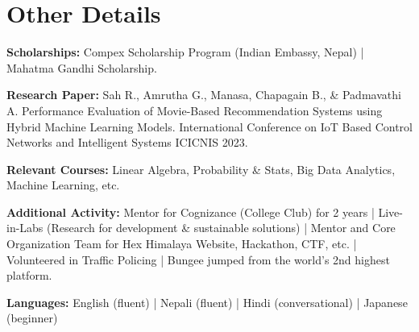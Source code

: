 \documentclass[a4paper,11pt]{article}
\begin{document}
\section{Other Details}
\begin{itemize}[leftmargin=0.15in, label={}]
	\setlength\itemsep{-2pt}
	\small{
\item{
		      \textbf{Scholarships:}{ Compex Scholarship Program (Indian Embassy, Nepal) | Mahatma Gandhi Scholarship.} \\
		}

\item{
		      \textbf{Research Paper:}{ Sah R., Amrutha G., Manasa, Chapagain B., \& Padmavathi A. Performance Evaluation of Movie-Based Recommendation Systems using Hybrid Machine Learning Models. International Conference on IoT Based Control Networks and Intelligent Systems ICICNIS 2023.
		      	} \\
		}
		
		\item{
		      \textbf{Relevant Courses:}{ Linear Algebra, Probability \& Stats, Big Data Analytics, Machine Learning, etc.} \\
		}

    	
 
 \item{
		\textbf{Additional Activity:}{ Mentor for Cognizance (College Club) for 2 years | Live-in-Labs (Research for development \& sustainable solutions) | Mentor and Core Organization Team for Hex Himalaya Website, Hackathon, CTF, etc.} | Volunteered in Traffic Policing |  Bungee jumped from the world's 2nd highest platform. \\
		}

		\item{
		      \textbf{Languages:}{ English (fluent) | Nepali (fluent) | Hindi (conversational) | Japanese (beginner)}
	}
 
 }
\end{itemize}

\end{document}
